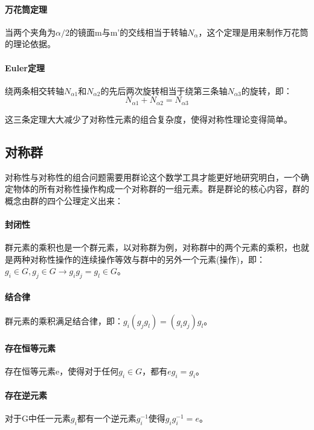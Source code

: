 \paragraph{万花筒定理}
当两个夹角为$\alpha/2$的镜面m与m'的交线相当于转轴$N_{\alpha}$，这个定理是用来制作万花筒的理论依据。

\paragraph{Euler定理}
绕两条相交转轴$N_{\alpha 1}\text{和}N_{\alpha 2}$的先后两次旋转相当于绕第三条轴$N_{\alpha 3}$的旋转，即：
\begin{equation}
    N_{\alpha 1} +N_{\alpha 2}=N_{\alpha 3}
\end{equation}

这三条定理大大减少了对称性元素的组合复杂度，使得对称性理论变得简单。

\subsection{对称群}

对称性与对称性的组合问题需要用群论这个数学工具才能更好地研究明白，一个确定物体的所有对称性操作构成一个对称群的一组元素。群是群论的核心内容，群的概念由群的四个公理定义出来：

\paragraph{封闭性}
群元素的乘积也是一个群元素，以对称群为例，对称群中的两个元素的乘积，也就是两种对称性操作的连续操作等效与群中的另外一个元素(操作)，即：$g_{i} \in G , g_{j} \in G  \rightarrow g_{i}g_{j} =g_{l} \in G $。

\paragraph{结合律}
群元素的乘积满足结合律，即：$g_{i}(g_{j}g_{l})=(g_{i}g_{j})g_{l}$。

\paragraph{存在恒等元素}
存在恒等元素e，使得$\text{对于任何}g_{i} \in G \text{，都有} eg_{i}=g_{i}$。

\paragraph{存在逆元素}
对于G中任一元素$g_{i}\text{都有一个逆元素}g^{-1}_{i}\text{使得}g_{i}g_{i}^{-1}=e$。

